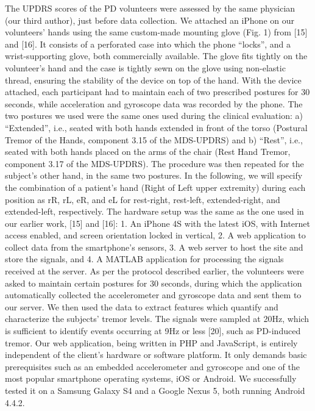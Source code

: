 The UPDRS scores of the PD volunteers were assessed by the same physician (our third author), just before data collection. We attached an iPhone on our volunteers’ hands using the same custom-made mounting glove (Fig. 1) from [15] and [16]. It consists of a perforated case into which the phone “locks”, and a wrist-supporting glove, both commercially available. The glove fits tightly on the volunteer’s hand and the case is tightly sewn on the glove using non-elastic thread, ensuring the stability of the device on top of the hand. With the device attached, each participant had to maintain each of two prescribed postures for 30 seconds, while acceleration and gyroscope data was recorded by the phone. The two postures we used were the same ones used during the clinical evaluation: a) “Extended”, i.e., seated with both hands extended in front of the torso (Postural Tremor of the Hands, component 3.15 of the MDS-UPDRS) and b) “Rest”, i.e., seated with both hands placed on the arms of the chair (Rest Hand Tremor, component 3.17 of the MDS-UPDRS). The procedure was then repeated for the subject’s other hand, in the same two postures. In the following, we will specify the combination of a patient’s hand (Right of Left upper extremity) during each position as rR, rL, eR, and eL for rest-right, rest-left, extended-right, and extended-left, respectively.
The hardware setup was the same as the one used in our earlier work, [15] and [16]: 
1.	An iPhone 4S with the latest iOS, with Internet access enabled, and screen orientation locked in vertical,
2.	A web application to collect data from the smartphone’s sensors,
3.	A web server to host the site and store the signals, and
4.	A MATLAB application for processing the signals received at the server.
As per the protocol described earlier, the volunteers were asked to maintain certain postures for 30 seconds, during which the application automatically collected the accelerometer and gyroscope data and sent them to our server. We then used the data to extract features which quantify and characterize the subjects’ tremor levels. The signals were sampled at 20Hz, which is sufficient to identify events occurring at 9Hz or less [20], such as PD-induced tremor. 
Our web application, being written in PHP and JavaScript, is entirely independent of the client's hardware or software platform. It only demands basic prerequisites such as an embedded accelerometer and gyroscope and one of the most popular smartphone operating systems, iOS or Android. We successfully tested it on a Samsung Galaxy S4 and a Google Nexus 5, both running Android 4.4.2. 




